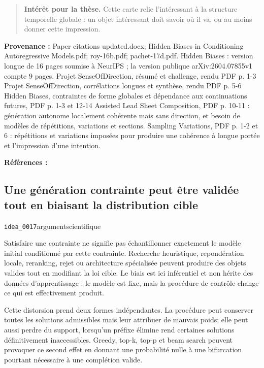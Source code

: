 \documentclass[10pt,a4paper]{article}
\begin{document}
\begin{quote}
\textbf{Intérêt pour la thèse.} Cette carte relie l'intéressant à la structure temporelle globale : un objet intéressant doit savoir où il va, ou au moins donner cette impression.
\end{quote}
{\footnotesize\color{metadata}\textbf{Provenance :} Paper citations updated.docx; Hidden Biases in Conditioning Autoregressive Models.pdf; roy-16b.pdf; pachet-17d.pdf. Hidden Biases : version longue de 16 pages soumise à NeurIPS ; la version publique arXiv:2604.07855v1 compte 9 pages. Projet SenseOfDirection, résumé et challenge, rendu PDF p. 1-3 Projet SenseOfDirection, corrélations longues et synthèse, rendu PDF p. 5-6 Hidden Biases, contraintes de forme globales et dépendance aux continuations futures, PDF p. 1-3 et 12-14 Assisted Lead Sheet Composition, PDF p. 10-11 : génération autonome localement cohérente mais sans direction, et besoin de modèles de répétitions, variations et sections. Sampling Variations, PDF p. 1-2 et 6 : répétitions et variations imposées pour produire une cohérence à longue portée et l'impression d'une intention.\par}
{\footnotesize\color{metadata}\textbf{Références :} \parencite{pachet2026biases,papadopoulos2016flowcomposer,pachet2017variations}\par}

\subsection{Une génération contrainte peut être validée tout en biaisant la distribution cible}
{\small\color{metadata} \texttt{idea\_0017}\quad\textbullet\quad argument\quad\textbullet\quad scientifique\par}

Satisfaire une contrainte ne signifie pas échantillonner exactement le modèle initial conditionné par cette contrainte. Recherche heuristique, repondération locale, reranking, rejet ou architecture spécialisée peuvent produire des objets valides tout en modifiant la loi cible. Le biais est ici inférentiel et non hérite des données d'apprentissage : le modèle est fixe, mais la procédure de contrôle change ce qui est effectivement produit.

Cette distorsion prend deux formes indépendantes. La procédure peut conserver toutes les solutions admissibles mais leur attribuer de mauvais poids; elle peut aussi perdre du support, lorsqu'un préfixe élimine rend certaines solutions définitivement inaccessibles. Greedy, top-k, top-p et beam search peuvent provoquer ce second effet en donnant une probabilité nulle à une bifurcation pourtant nécessaire à une complétion valide.
\end{document}
